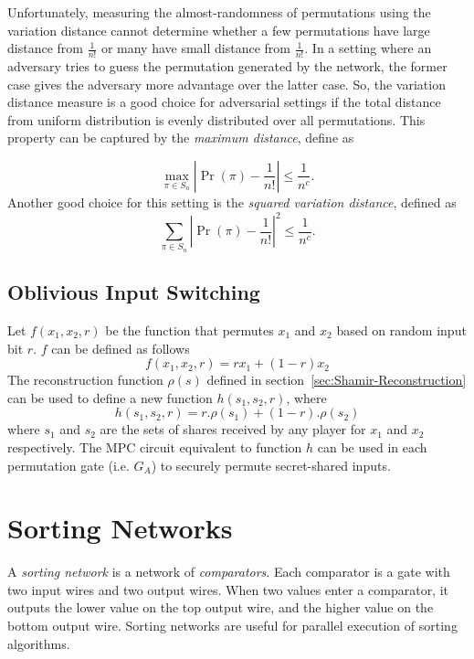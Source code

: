 \documentclass[11pt]{article}
\theoremstyle{plain}
\begin{document}
Unfortunately, measuring the almost-randomness of permutations using
the variation distance cannot determine whether a few permutations
have large distance from $\frac{1}{n!}$ or many have small distance
from $\frac{1}{n!}$. In a setting where an adversary tries to guess
the permutation generated by the network, the former case gives the
adversary more advantage over the latter case. So, the variation distance
measure is a good choice for adversarial settings if the total distance
from uniform distribution is evenly distributed over all permutations.
This property can be captured by the \emph{maximum distance}, define
as

\[
\max_{\pi\in S_{n}}|\Pr(\pi)-\frac{1}{n!}|\leq\frac{1}{n^{c}}.
\]
Another good choice for this setting is the \emph{squared variation
	distance}, defined as 
\[
\sum_{\pi\in S_{n}}|\Pr(\pi)-\frac{1}{n!}|^{2}\leq\frac{1}{n^{c}}.
\]


\subsection{Oblivious Input Switching}

Let $f(x_{1},x_{2},r)$ be the function that permutes $x_{1}$ and
$x_{2}$ based on random input bit $r$. $f$ can be defined as follows
\[
f(x_{1},x_{2},r)=rx_{1}+(1-r)x_{2}
\]
The reconstruction function $\rho(s)$ defined in section~\ref{sec:Shamir-Reconstruction}
can be used to define a new function $h(s_{1},s_{2},r)$, where 
\[
h(s_{1},s_{2},r)=r.\rho(s_{1})+(1-r).\rho(s_{2})
\]
where $s_{1}$ and $s_{2}$ are the sets of shares received by any
player for $x_{1}$ and $x_{2}$ respectively. The MPC circuit equivalent
to function $h$ can be used in each permutation gate (i.e. $G_{A}$)
to securely permute secret-shared inputs.

\section{Sorting Networks}

A \emph{sorting network} is a network of \emph{comparators}. Each
comparator is a gate with two input wires and two output wires. When
two values enter a comparator, it outputs the lower value on the top
output wire, and the higher value on the bottom output wire. Sorting
networks are useful for parallel execution of sorting algorithms.
\end{document}
